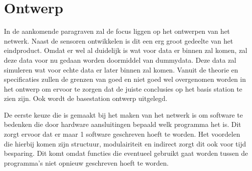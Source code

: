 \section{Ontwerp}
In de aankomende paragraven zal de focus liggen op het ontwerpen van het netwerk. Naast de sensoren ontwikkelen is dit een erg groot gedeelte
van het eindproduct. Omdat er wel al duidelijk is wat voor data er binnen zal komen, zal deze data voor nu gedaan worden doormiddel van dummydata. 
Deze data zal simuleren wat voor echte data er later binnen zal komen. Vanuit de theorie en specificaties zullen de grenzen van goed en niet goed wel overgenomen worden 
in het ontwerp om ervoor te zorgen dat de juiste conclusies op het basis station te zien zijn. Ook wordt de basestation ontwerp uitgelegd.  

De eerste keuze die is gemaakt bij het maken van het netwerk is om software te bedenken die door hardware aansluitingen bepaald welk programma het is.
Dit zorgt ervoor dat er maar 1 software geschreven hoeft te worden. Het voordelen die hierbij komen zijn structuur, modulairiteit en indirect zorgt dit ook voor 
tijd besparing. Dit komt omdat functies die eventueel gebruikt gaat worden tussen de programma's niet opnieuw geschreven hoeft te worden.




